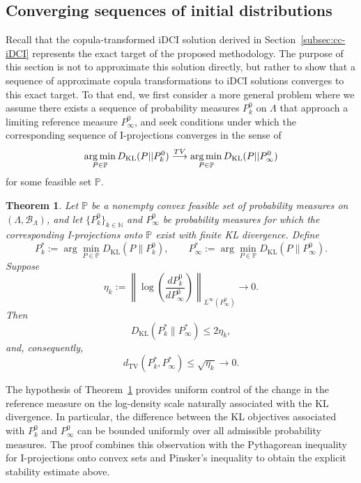 \documentclass{article}
\newtheorem{theorem}{Theorem}[section]
\newcommand{\p}{\mathbb{P}}
\newcommand{\pspace}{\Lambda}
\DeclareMathOperator*{\argmin}{arg\,min}
\begin{document}
\subsection{Converging sequences of initial distributions}\label{subsec:initial-sequences}

Recall that the copula-transformed iDCI solution derived in Section~\ref{subsec:cc-iDCI} represents the exact target of the proposed methodology.
The purpose of this section is not to approximate this solution directly, but rather to show that a sequence of approximate copula transformations to iDCI solutions converges to this exact target.
To that end, we first consider a more general problem where we assume there exists a sequence of probability measures $P_{k}^{0}$ on $\pspace$ that approach a limiting reference measure $P_\infty^0$, and seek conditions under which the corresponding sequence of I-projections converges in the sense of
\[
\argmin_{P \in \p}D_{\rm KL}(P || P_{k}^{0})
\overset{TV}{\longrightarrow}
\argmin_{P \in \p}D_{\rm KL}(P || P_\infty^{0})
\]
for some feasible set $\p$.

\begin{theorem}
\label{thm:mtd1_converges}
Let $\p$ be a nonempty convex feasible set of probability measures on
$(\Lambda,\mathcal{B}_{\Lambda})$, and let $\{P_k^0\}_{k\in\mathbb{N}}$
and $P_\infty^0$ be probability measures for which the corresponding
I-projections onto $\p$ exist with finite KL divergence. Define
\[
P_k^\ast
:=
\arg\min_{P\in\p}
D_{\mathrm{KL}}(P\|P_k^0),
\qquad
P_\infty^\ast
:=
\arg\min_{P\in\p}
D_{\mathrm{KL}}(P\|P_\infty^0).
\]
Suppose
\[
\eta_k
:=
\left\|
\log\left(
\frac{dP_k^0}{dP_\infty^0}
\right)
\right\|_{L^\infty(P_\infty^0)}
\longrightarrow 0.
\]
Then
\[
D_{\mathrm{KL}}(P_k^\ast\|P_\infty^\ast)
\leq 2\eta_k,
\]
and, consequently,
\[
d_{\mathrm{TV}}(P_k^\ast,P_\infty^\ast)
\leq \sqrt{\eta_k}
\longrightarrow 0.
\]
\end{theorem}

The hypothesis of Theorem~\ref{thm:mtd1_converges} provides uniform control of the change in the reference measure on the
log-density scale naturally associated with the KL divergence.
In particular,
the difference between the KL objectives associated with $P_k^0$ and
$P_\infty^0$ can be bounded uniformly over all admissible probability
measures.
The proof combines this observation with the Pythagorean inequality
for I-projections onto convex sets and Pinsker's inequality to obtain the
explicit stability estimate above.
\end{document}
